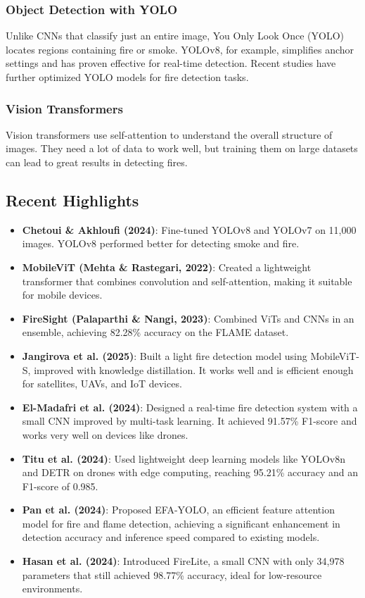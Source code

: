 \documentclass{article}
\begin{document}
\subsubsection{Object Detection with YOLO}
Unlike CNNs that classify just an entire image, You Only Look Once (YOLO) locates regions containing fire or smoke. YOLOv8, for example, simplifies anchor settings and has proven effective for real-time detection. Recent studies have further optimized YOLO models for fire detection tasks.

\subsubsection{Vision Transformers}
Vision transformers use self-attention to understand the overall structure of images. They need a lot of data to work well, but training them on large datasets can lead to great results in detecting fires.

\subsection{Recent Highlights}
\begin{itemize}
    \item \textbf{Chetoui \& Akhloufi (2024)}: Fine-tuned YOLOv8 and YOLOv7 on 11,000 images. YOLOv8 performed better for detecting smoke and fire.
    \item \textbf{MobileViT (Mehta \& Rastegari, 2022)}: Created a lightweight transformer that combines convolution and self-attention, making it suitable for mobile devices.
    \item \textbf{FireSight (Palaparthi \& Nangi, 2023)}: Combined ViTs and CNNs in an ensemble, achieving 82.28\% accuracy on the FLAME dataset.
    \item \textbf{Jangirova et al. (2025)}: Built a light fire detection model using MobileViT-S, improved with knowledge distillation. It works well and is efficient enough for satellites, UAVs, and IoT devices.
    \item \textbf{El-Madafri et al. (2024)}: Designed a real-time fire detection system with a small CNN improved by multi-task learning. It achieved 91.57\% F1-score and works very well on devices like drones.
    \item \textbf{Titu et al. (2024)}: Used lightweight deep learning models like YOLOv8n and DETR on drones with edge computing, reaching 95.21\% accuracy and an F1-score of 0.985.
    \item \textbf{Pan et al. (2024)}: Proposed EFA-YOLO, an efficient feature attention model for fire and flame detection, achieving a significant enhancement in detection accuracy and inference speed compared to existing models.
    \item \textbf{Hasan et al. (2024)}: Introduced FireLite, a small CNN with only 34,978 parameters that still achieved 98.77\% accuracy, ideal for low-resource environments.
\end{itemize}
\end{document}
